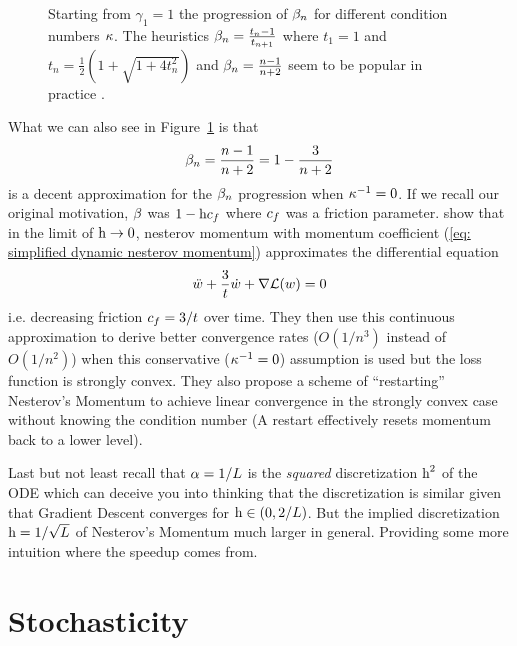 \begin{figure}[h]
	\centering
	\def\svgwidth{1\textwidth}
	
	\caption{
		Starting from \(\gamma_1=1\) the progression of \(\beta_n\) for
		different condition numbers \(\kappa\). The heuristics
		\(\beta_n=\frac{t_n-1}{t_{n+1}}\) where \(t_1=1\) and
		\(t_n=\tfrac12(1+\sqrt{1+4t_n^2})\) and \(\beta_n=\frac{n-1}{n+2}\)
		seem to be popular in practice \parencite{rechtOptimization2013}.
	}
	\label{fig: momentum progression}
\end{figure}

What we can also see in Figure~\ref{fig: momentum progression} is that
\begin{align}\label{eq: simplified dynamic nesterov momentum}
	\beta_n = \frac{n-1}{n+2} = 1-\frac{3}{n+2}
\end{align}
is a decent approximation for the \(\beta_n\) progression when \(\kappa^{-1}=0\).
If we recall our original motivation, \(\beta\) was \(1-\text{h}c_f\) where
\(c_f\) was a friction parameter. \textcite{suDifferentialEquationModeling2015}
show that in the limit of \(\text{h}\to0\), nesterov momentum with momentum
coefficient (\ref{eq: simplified dynamic nesterov momentum}) approximates the
differential equation
\begin{align*}
	\ddot{w} + \frac{3}{t}\dot{w} + \nabla\mathcal{L}(w) = 0
\end{align*}
i.e. decreasing friction \(c_f=3/t\) over time. They then use this
continuous approximation to derive better convergence rates (\(O(1/n^3)\) instead of
\(O(1/n^2)\)) when this conservative (\(\kappa^{-1}=0\)) assumption is used
but the loss function is strongly convex. They also propose a scheme of
``restarting'' Nesterov's Momentum to achieve linear convergence in the
strongly convex case without knowing the condition number (A restart effectively
resets momentum back to a lower level).

Last but not least recall that \(\alpha=1/L\) is the \emph{squared}
discretization \(\text{h}^2\) of the ODE which can deceive you into thinking that the
discretization is similar given that Gradient Descent converges for \(\text{h} \in
(0,2/L)\). But the implied discretization \(\text{h}=1/\sqrt{L}\) of
Nesterov's Momentum much larger in general. Providing some more intuition where the
speedup comes from.


\section{Stochasticity}

